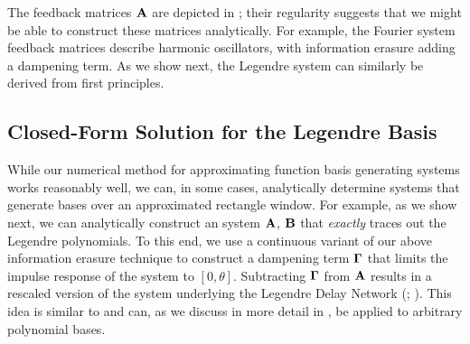 The feedback matrices $\mathbf{A}$ are depicted in ; their regularity suggests that we might be able to construct these matrices analytically.
For example, the Fourier system feedback matrices describe harmonic oscillators, with information erasure adding a dampening term.
As we show next, the Legendre system can similarly be derived from first principles.

\subsection{Closed-Form Solution for the Legendre Basis}
\label{sec:ldn_derivation}

While our numerical method for approximating function basis generating \LTI systems works reasonably well, we can, in some cases, analytically determine \LTI systems that generate bases over an approximated rectangle window.
For example, as we show next, we can analytically construct an \LTI system ${\mathbf{A}}$, ${\mathbf{B}}$ that \emph{exactly} traces out the Legendre polynomials.
To this end, we use a continuous variant of our above information erasure technique to construct a dampening term $\mathbf{\Gamma}$ that limits the impulse response of the system to $[0, \theta]$.
Subtracting $\mathbf{\Gamma}$ from $\mathbf{A}$ results in a rescaled version of the \LTI system underlying the Legendre Delay Network (\LDN; \cite{voelker2018improving}).
This idea is similar to \citet{gu2020hippo} and can, as we discuss in more detail in \citet{stockel2021constructing}, be applied to arbitrary polynomial bases.

